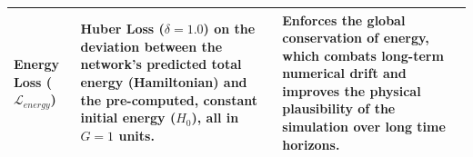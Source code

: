 \begin{small}
\begin{longtable}{|>{\raggedright\arraybackslash}p{}|>{\raggedright\arraybackslash}p{}|>{\raggedright\arraybackslash}p{}|}
\hline
\textbf{Energy Loss ($\mathcal{L}_{energy}$)} & \textbf{Huber Loss ($\delta=1.0$)} on the deviation between the network's predicted total energy (Hamiltonian) and the pre-computed, constant initial energy ($H_0$), all in $G=1$ units. & Enforces the global conservation of energy, which combats long-term numerical drift and improves the physical plausibility of the simulation over long time horizons. \\
\hline
\end{longtable}
\end{small}
